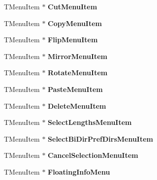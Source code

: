 \begin{DoxyCompactItemize}
\item 
\mbox{\label{class_t_interface_ab94f4eac102d12975501ffd0f236e8f4}} 
T\+Menu\+Item $\ast$ {\bfseries Cut\+Menu\+Item}
\item 
\mbox{\label{class_t_interface_ae714ce08c9c73f5de0bfd5bf229f80ed}} 
T\+Menu\+Item $\ast$ {\bfseries Copy\+Menu\+Item}
\item 
\mbox{\label{class_t_interface_add6aa7a490de7b80bd9da90266bdbe1c}} 
T\+Menu\+Item $\ast$ {\bfseries Flip\+Menu\+Item}
\item 
\mbox{\label{class_t_interface_a2ab7304ec2fbc435f26d6ad802e22d23}} 
T\+Menu\+Item $\ast$ {\bfseries Mirror\+Menu\+Item}
\item 
\mbox{\label{class_t_interface_af30749cc8ec12872ef1d8a0c90d31498}} 
T\+Menu\+Item $\ast$ {\bfseries Rotate\+Menu\+Item}
\item 
\mbox{\label{class_t_interface_a49148e002db900dbbf7341aca95e67b5}} 
T\+Menu\+Item $\ast$ {\bfseries Paste\+Menu\+Item}
\item 
\mbox{\label{class_t_interface_a8ad5f1db988eb5360b126b21fb9953ea}} 
T\+Menu\+Item $\ast$ {\bfseries Delete\+Menu\+Item}
\item 
\mbox{\label{class_t_interface_a605c84f7a0ab307cf5a16a4ab2dd89a5}} 
T\+Menu\+Item $\ast$ {\bfseries Select\+Lengths\+Menu\+Item}
\item 
\mbox{\label{class_t_interface_a1ac4134f6658c7f6de09ef354c0ccac8}} 
T\+Menu\+Item $\ast$ {\bfseries Select\+Bi\+Dir\+Pref\+Dirs\+Menu\+Item}
\item 
\mbox{\label{class_t_interface_adfbb51de41895e146c88bb433fde97ba}} 
T\+Menu\+Item $\ast$ {\bfseries Cancel\+Selection\+Menu\+Item}
\item 
\mbox{\label{class_t_interface_a57d5981fe7fe4db9507c583c3e23b438}} 
T\+Menu\+Item $\ast$ {\bfseries Floating\+Info\+Menu}
\item 

\end{DoxyCompactItemize}
